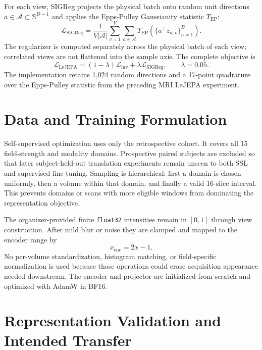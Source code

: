 \documentclass[10pt]{article}
\begin{document}
For each view, SIGReg projects the physical batch onto random unit directions
$a\in\mathcal{A}\subset\mathbb{S}^{D-1}$ and applies the Epps-Pulley
Gaussianity statistic $T_{\mathrm{EP}}$:
\begin{equation}
  \mathcal{L}_{\mathrm{SIGReg}}
  =\frac{1}{V|\mathcal{A}|}
   \sum_{v=1}^{V}\sum_{a\in\mathcal{A}}
   T_{\mathrm{EP}}\!\left(\{a^{\top}z_{n,v}\}_{n=1}^{B}\right).
\end{equation}
The regularizer is computed separately across the physical batch of each view;
correlated views are not flattened into the sample axis. The complete objective
is \cite{lejepa}
\begin{equation}
  \mathcal{L}_{\mathrm{LeJEPA}}
  =(1-\lambda)\mathcal{L}_{\mathrm{inv}}
  +\lambda\mathcal{L}_{\mathrm{SIGReg}},\qquad \lambda=0.05.
\end{equation}
The implementation retains 1,024 random directions and a 17-point quadrature
over the Epps-Pulley statistic from the preceding MRI LeJEPA experiment.

\section{Data and Training Formulation}

Self-supervised optimization uses only the retrospective cohort. It covers all
15 field-strength and modality domains. Prospective paired subjects are
excluded so that later subject-held-out translation experiments remain unseen
to both SSL and supervised fine-tuning. Sampling is hierarchical: first a
domain is chosen uniformly, then a volume within that domain, and finally a
valid 16-slice interval. This prevents domains or scans with more eligible
windows from dominating the representation objective.

The organizer-provided finite \texttt{float32} intensities remain in $[0,1]$
through view construction. After mild blur or noise they are clamped and mapped
to the encoder range by
\begin{equation}
  x_{\mathrm{enc}}=2x-1.
\end{equation}
No per-volume standardization, histogram matching, or field-specific
normalization is used because those operations could erase acquisition
appearance needed downstream. The encoder and projector are initialized from
scratch and optimized with AdamW in BF16.

\section{Representation Validation and Intended Transfer}
\end{document}
